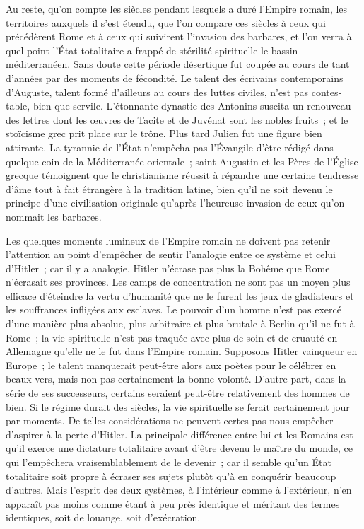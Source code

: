 \documentclass[french,twoside]{book} %
\begin{document}
Au reste, qu'on compte les siècles pendant lesquels a duré l'Empire romain, les territoires auxquels il s'est étendu, que l'on compare ces siècles à ceux qui précédèrent Rome et à ceux qui suivirent l'invasion des barbares, et l'on verra à quel point l'État totalitaire a frappé de stérilité spirituelle le bassin méditerranéen. Sans doute cette période désertique fut coupée au cours de tant d'années par des moments de fécondité. Le talent des écrivains contemporains d'Auguste, talent formé d'ailleurs au cours des luttes civiles, n'est pas contes­table, bien que servile. L'étonnante dynastie des Antonins suscita un renou­veau des lettres dont les œuvres de Tacite et de Juvénat sont les nobles fruits ; et le stoïcisme grec prit place sur le trône. Plus tard Julien fut une figure bien attirante. La tyrannie de l'État n'empêcha pas l'Évangile d'être rédigé dans quelque coin de la Méditerranée orientale ; saint Augustin et les Pères de l'Église grecque témoignent que le christianisme réussit à répandre une certai­ne tendresse d'âme tout à fait étrangère à la tradition latine, bien qu'il ne soit devenu le principe d'une civilisation originale qu'après l'heureuse invasion de ceux qu'on nommait les barbares.\par
Les quelques moments lumineux de l'Empire romain ne doivent pas retenir l'attention au point d'empêcher de sentir l'analogie entre ce système et celui d'Hitler ; car il y a analogie. Hitler n'écrase pas plus la Bohême que Rome n'écrasait ses provinces. Les camps de concentration ne sont pas un moyen plus efficace d'éteindre la vertu d'humanité que ne le furent les jeux de gladiateurs et les souffrances infligées aux esclaves. Le pouvoir d'un homme n'est pas exercé d'une manière plus absolue, plus arbitraire et plus brutale à Berlin qu'il ne fut à Rome ; la vie spirituelle n'est pas traquée avec plus de soin et de cruauté en Allemagne qu'elle ne le fut dans l'Empire romain. Supposons Hitler vainqueur en Europe ; le talent manquerait peut-être alors aux poètes pour le célébrer en beaux vers, mais non pas certainement la bonne volonté. D'autre part, dans la série de ses successeurs, certains seraient peut-être relativement des hommes de bien. Si le régime durait des siècles, la vie spirituelle se ferait certainement jour par moments. De telles considérations ne peuvent certes pas nous empêcher d'aspirer à la perte d'Hitler. La principale différence entre lui et les Romains est qu'il exerce une dictature totalitaire avant d'être devenu le maître du monde, ce qui l'empêchera vraisembla­blement de le devenir ; car il semble qu'un État totalitaire soit propre à écraser ses sujets plutôt qu'à en conquérir beaucoup d'autres. Mais l'esprit des deux systèmes, à l'intérieur comme à l'extérieur, n'en apparaît pas moins comme étant à peu près identique et méritant des termes identiques, soit de louange, soit d'exécration.
\end{document}
